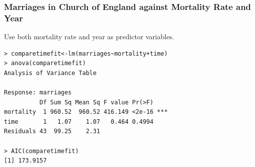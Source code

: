 \documentclass[%
xcolor=pdftex]{beamer}
\begin{document}
\begin{frame}[fragile]
\frametitle{Marriages in Church of England against Mortality Rate and Year}

Use both mortality rate and year as predictor variables.

\begin{verbatim}
> comparetimefit<-lm(marriages~mortality+time)
> anova(comparetimefit)
Analysis of Variance Table

Response: marriages
          Df Sum Sq Mean Sq F value Pr(>F)
mortality  1 960.52  960.52 416.149 <2e-16 ***
time       1   1.07    1.07   0.464 0.4994
Residuals 43  99.25    2.31

> AIC(comparetimefit)
[1] 173.9157
\end{verbatim}

\end{frame}
\end{document}

